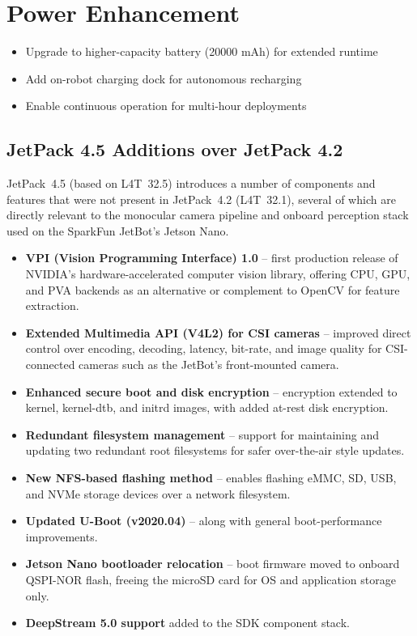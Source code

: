 \section{Power Enhancement}

\begin{itemize}
    \item Upgrade to higher-capacity battery (20000 mAh) for extended runtime
    \item Add on-robot charging dock for autonomous recharging
    \item Enable continuous operation for multi-hour deployments
\end{itemize}

\subsection{JetPack 4.5 Additions over JetPack 4.2}

JetPack~4.5 (based on L4T~32.5) introduces a number of components and features that
were not present in JetPack~4.2 (L4T~32.1), several of which are directly relevant to
the monocular camera pipeline and onboard perception stack used on the SparkFun
JetBot's Jetson Nano.

\begin{itemize}
	\item \textbf{VPI (Vision Programming Interface) 1.0} -- first production release
	of NVIDIA's hardware-accelerated computer vision library, offering CPU, GPU, and
	PVA backends as an alternative or complement to OpenCV for feature extraction.
	\item \textbf{Extended Multimedia API (V4L2) for CSI cameras} -- improved direct
	control over encoding, decoding, latency, bit-rate, and image quality for
	CSI-connected cameras such as the JetBot's front-mounted camera.
	\item \textbf{Enhanced secure boot and disk encryption} -- encryption extended to
	kernel, kernel-dtb, and initrd images, with added at-rest disk encryption.
	\item \textbf{Redundant filesystem management} -- support for maintaining and
	updating two redundant root filesystems for safer over-the-air style updates.
	\item \textbf{New NFS-based flashing method} -- enables flashing eMMC, SD, USB, and
	NVMe storage devices over a network filesystem.
	\item \textbf{Updated U-Boot (v2020.04)} -- along with general boot-performance
	improvements.
	\item \textbf{Jetson Nano bootloader relocation} -- boot firmware moved to onboard
	QSPI-NOR flash, freeing the microSD card for OS and application storage only.
	\item \textbf{DeepStream 5.0 support} added to the SDK component stack.
\end{itemize}

